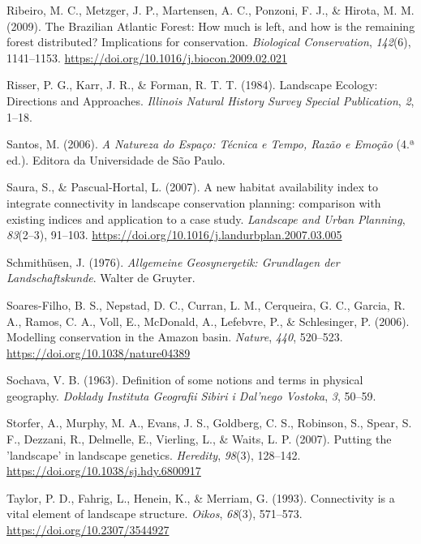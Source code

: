 \documentclass[
  portuguese,
  11pt,
  a4paper,
  open=any]{scrbook}
\newlength{\cslhangindent}
\newenvironment{CSLReferences}[2] %
 {\begin{list}{}{%
  \setlength{\itemindent}{0pt}
  \setlength{\leftmargin}{0pt}
  \setlength{\parsep}{0pt}
  \ifodd #1
   \setlength{\leftmargin}{\cslhangindent}
   \setlength{\itemindent}{-1\cslhangindent}
  \fi
  \setlength{\itemsep}{#2\baselineskip}}}
 {\end{list}}
\begin{document}
\begin{CSLReferences}{1}{0}
Ribeiro, M. C., Metzger, J. P., Martensen, A. C., Ponzoni, F. J., \&
Hirota, M. M. (2009). The Brazilian Atlantic Forest: How much is left,
and how is the remaining forest distributed? Implications for
conservation. \emph{Biological Conservation}, \emph{142}(6), 1141--1153.
\url{https://doi.org/10.1016/j.biocon.2009.02.021}

Risser, P. G., Karr, J. R., \& Forman, R. T. T. (1984). Landscape
Ecology: Directions and Approaches. \emph{Illinois Natural History
Survey Special Publication}, \emph{2}, 1--18.

Santos, M. (2006). \emph{A Natureza do Espaço: Técnica e Tempo, Razão e
Emoção} (4.ª ed.). Editora da Universidade de São Paulo.

Saura, S., \& Pascual-Hortal, L. (2007). A new habitat availability
index to integrate connectivity in landscape conservation planning:
comparison with existing indices and application to a case study.
\emph{Landscape and Urban Planning}, \emph{83}(2--3), 91--103.
\url{https://doi.org/10.1016/j.landurbplan.2007.03.005}

Schmithüsen, J. (1976). \emph{Allgemeine Geosynergetik: Grundlagen der
Landschaftskunde}. Walter de Gruyter.

Soares-Filho, B. S., Nepstad, D. C., Curran, L. M., Cerqueira, G. C.,
Garcia, R. A., Ramos, C. A., Voll, E., McDonald, A., Lefebvre, P., \&
Schlesinger, P. (2006). Modelling conservation in the Amazon basin.
\emph{Nature}, \emph{440}, 520--523.
\url{https://doi.org/10.1038/nature04389}

Sochava, V. B. (1963). Definition of some notions and terms in physical
geography. \emph{Doklady Instituta Geografii Sibiri i Dal'nego Vostoka},
\emph{3}, 50--59.

Storfer, A., Murphy, M. A., Evans, J. S., Goldberg, C. S., Robinson, S.,
Spear, S. F., Dezzani, R., Delmelle, E., Vierling, L., \& Waits, L. P.
(2007). Putting the 'landscape' in landscape genetics. \emph{Heredity},
\emph{98}(3), 128--142. \url{https://doi.org/10.1038/sj.hdy.6800917}

Taylor, P. D., Fahrig, L., Henein, K., \& Merriam, G. (1993).
Connectivity is a vital element of landscape structure. \emph{Oikos},
\emph{68}(3), 571--573. \url{https://doi.org/10.2307/3544927}


\end{CSLReferences}
\end{document}
